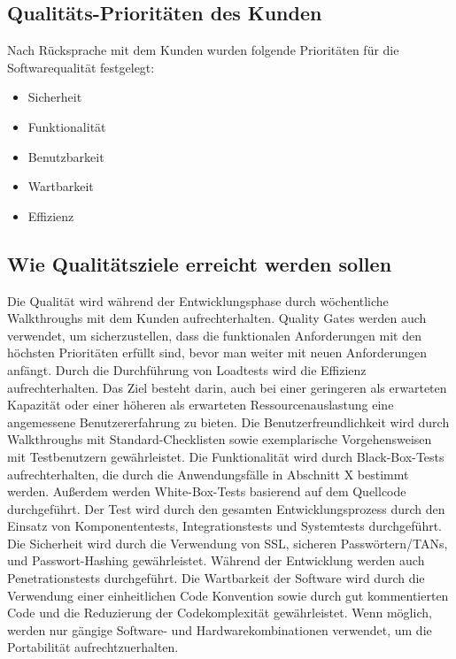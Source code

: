 	\subsection{Qualitäts-Prioritäten des Kunden}
		
    Nach Rücksprache mit dem Kunden wurden folgende Prioritäten für die Softwarequalität festgelegt:

		\begin{itemize}
			\item Sicherheit 
            \item Funktionalität
           	\item Benutzbarkeit
            \item Wartbarkeit
            \item Effizienz

		\end{itemize}

	\subsection{Wie Qualitätsziele erreicht werden sollen}
	
	Die Qualität wird während der Entwicklungsphase durch wöchentliche Walkthroughs mit dem Kunden aufrechterhalten. Quality Gates werden auch verwendet, um sicherzustellen, dass die funktionalen Anforderungen mit den höchsten Prioritäten erfüllt sind, bevor man weiter mit neuen Anforderungen anfängt.
	\linebreak
    Durch die Durchführung von Loadtests wird die Effizienz aufrechterhalten. Das Ziel besteht darin, auch bei einer geringeren als erwarteten Kapazität oder einer höheren als erwarteten Ressourcenauslastung eine angemessene Benutzererfahrung zu bieten. 
	\linebreak
	Die Benutzerfreundlichkeit wird durch Walkthroughs mit Standard-Checklisten sowie exemplarische Vorgehensweisen mit Testbenutzern gewährleistet.
	\linebreak
	Die Funktionalität wird durch Black-Box-Tests aufrechterhalten, die durch die Anwendungsfälle in Abschnitt X bestimmt werden. Außerdem werden White-Box-Tests basierend auf dem Quellcode durchgeführt. Der Test wird durch den gesamten Entwicklungsprozess durch den Einsatz von Komponententests, Integrationstests und Systemtests durchgeführt.
	\linebreak
	Die Sicherheit wird durch die Verwendung von SSL, sicheren Passwörtern/TANs, und Passwort-Hashing gewährleistet. Während der Entwicklung werden auch Penetrationstests durchgeführt.
	\linebreak
	Die Wartbarkeit der Software wird durch die Verwendung einer einheitlichen Code Konvention sowie durch gut kommentierten Code und die Reduzierung der Codekomplexität gewährleistet.
	\linebreak
	Wenn möglich, werden nur gängige Software- und Hardwarekombinationen verwendet, um die Portabilität aufrechtzuerhalten.

	
	
